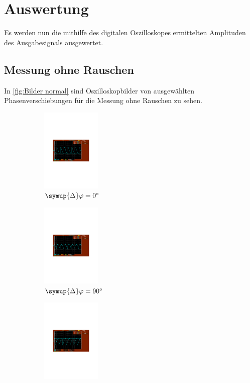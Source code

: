\section{Auswertung}
\label{sec:Auswertung}
Es werden nun die mithilfe des digitalen Oszilloskopes ermittelten Amplituden des Ausgabesignals ausgewertet.

\subsection{Messung ohne Rauschen}
\label{sec:ohne rauschen}
In \autoref{fig:Bilder normal} sind Oszilloskopbilder von ausgewählten Phasenverschiebungen für die Messung ohne Rauschen zu sehen.

\begin{figure} [H]
  \begin{subfigure}{0.48\textwidth}
    \centering
    \includegraphics[height=4cm]{content/Bilder/unverrauscht/0.pdf}
    \caption{$\symup{\Delta}\varphi = \qty{0}{\degree}$}
    \label{fig:unverrauscht 0}
  \end{subfigure}
  \begin{subfigure}{0.48\textwidth}
    \centering
    \includegraphics[height=4cm]{content/Bilder/unverrauscht/90.pdf}
    \caption{$\symup{\Delta}\varphi = \qty{90}{\degree}$}
  \end{subfigure}
  \begin{subfigure}{0.48\textwidth}
    \centering
    \includegraphics[height=4cm]{content/Bilder/unverrauscht/180.pdf}

\end{subfigure}
\end{figure}
